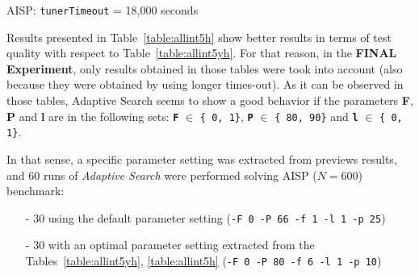 \begin{table}[h] 	
\centering 
\renewcommand{\arraystretch}{1.2}
\caption{AISP: \texttt{tunerTimeout} = 18,000 seconds}\label{table:allint5h}
\end{table}

Results presented in Table~\ref{table:allint5h} show better results in terms of test quality with respect to Table~\ref{table:allint5yh}. For that reason, in the \textbf{FINAL Experiment}, only results obtained in those tables were took into account (also because they were obtained by using longer times-out). As it can be observed in those tables, Adaptive Search seems to show a good behavior if the parameters {\bf F}, {\bf P} and {\bf l} are in the following sets: \texttt{\bf F} $\in$ \texttt{\{ 0, 1\}}, \texttt{\bf P} $\in$ \texttt{\{ 80, 90\}} and \texttt{\bf l} $\in$ \texttt{\{ 0, 1\}}.

In that sense, a specific parameter setting was extracted from previews results, and 60 runs of {\it Adaptive Search} were performed solving AISP ($N = 600$) benchmark:
\begin{itemize}
	\item[-] 30 using the default parameter setting (\texttt{-F 0 -P 66 -f 1 -l 1 -p 25})
	\item[-] 30 with an optimal parameter setting extracted from the Tables~\ref{table:allint5yh}, \ref{table:allint5h} (\texttt{-F 0 -P 80 -f 6 -l 1 -p 10})
\end{itemize}

